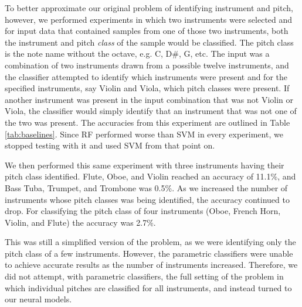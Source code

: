 \documentclass[runningheads,a4paper]{llncs}
\begin{document}
To better approximate our original problem of identifying instrument and pitch, however, we performed experiments in which two instruments were selected and for input data that contained samples from one of those two instruments, both the instrument and pitch \emph{class} of the sample would be classified. The pitch class is the note name without the octave, e.g. C, D\#, G, etc. The input was a combination of two instruments drawn from a possible twelve instruments, and the classifier attempted to identify which instruments were present and for the specified instruments, say Violin and Viola, which pitch classes were present. If another instrument was present in the input combination that was not Violin or Viola, the classifier would simply identify that an instrument that was not one of the two was present. The accuracies from this experiment are outlined in Table \ref{tab:baselines}. Since RF performed worse than SVM in every experiment, we stopped testing with it and used SVM from that point on.

We then performed this same experiment with three instruments having their pitch class identified. Flute, Oboe, and Violin reached an accuracy of 11.1\%, and Bass Tuba, Trumpet, and Trombone was 0.5\%. As we increased the number of instruments whose pitch classes was being identified, the accuracy continued to drop. For classifying the pitch class of four instruments (Oboe, French Horn, Violin, and Flute) the accuracy was 2.7\%.

This was still a simplified version of the problem, as we were identifying only the pitch class of a few instruments. However, the parametric classifiers were unable to achieve accurate results as the number of instruments increased. Therefore, we did not attempt, with parametric classifiers, the full setting of the problem in which individual pitches are classified for all instruments, and instead turned to our neural models.

\end{document}
